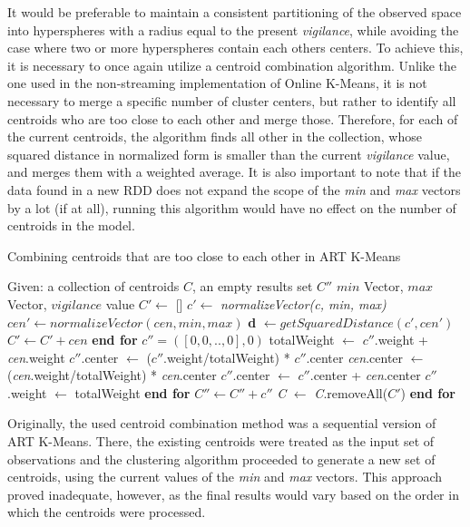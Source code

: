\documentclass{l4proj}
\begin{document}
It would be preferable to maintain a consistent partitioning of the observed space into hyperspheres with a radius equal to the present \textit{vigilance}, while avoiding the case where two or more hyperspheres contain each others centers. To achieve this, it is necessary to once again utilize a centroid combination algorithm. Unlike the one used in the non-streaming implementation of Online K-Means, it is not necessary to merge a specific number of cluster centers, but rather to identify all centroids who are too close to each other and merge those. Therefore, for each of the current centroids, the algorithm finds all other in the collection, whose squared distance in normalized form is smaller than the current \textit{vigilance} value, and merges them with a weighted average. It is also important to note that if the data found in a new RDD does not expand the scope of the \textit{min} and \textit{max} vectors by a lot (if at all), running this algorithm would have no effect on the number of centroids in the model.

\begin{algorithm}[H]
\caption{Combining centroids that are too close to each other in ART K-Means}
\begin{algorithmic}[1]
\State Given: a collection of centroids $C$, an empty results set $C''$ 
\State \hspace{1.1cm} $min$ Vector, $max$ Vector, $vigilance$ value
    \State $C' \gets$ []
    \State $c' \gets$ \textit{normalizeVector(c, min, max)}
        \State $cen' \gets normalizeVector(cen, min, max)$
        \State \textbf{d} $\gets getSquaredDistance(c', cen')$
            \State $C' \gets C' + cen$
        \EndIf
    \EndFor
    \State \textbf{end for}
    \State $c'' = ([0 ,0, .., 0], 0)$
    	\State totalWeight $\gets$ $c''$.weight + \textit{cen}.weight
        \State $c''$.center $\gets$ ($c''$.weight/totalWeight) * $c''$.center
        \State \textit{cen}.center $\gets$ (\textit{cen}.weight/totalWeight) * \textit{cen}.center
        \State $c''$.center $\gets$ $c''$.center + \textit{cen}.center
        \State $c''$.weight $\gets$ totalWeight
    \EndFor
    \State \textbf{end for}
    \State $C'' \gets C'' + c''$
    \State \textit{C} $\gets$ \textit{C}.removeAll($C'$)
\EndFor
\State \textbf{end for}
\end{algorithmic}
\end{algorithm}

Originally, the used centroid combination method was a sequential version of ART K-Means. There, the existing centroids were treated as the input set of observations and the clustering algorithm proceeded to generate a new set of centroids, using the current values of the \textit{min} and \textit{max} vectors. This approach proved inadequate, however, as the final results would vary based on the order in which the centroids were processed.
\end{document}
